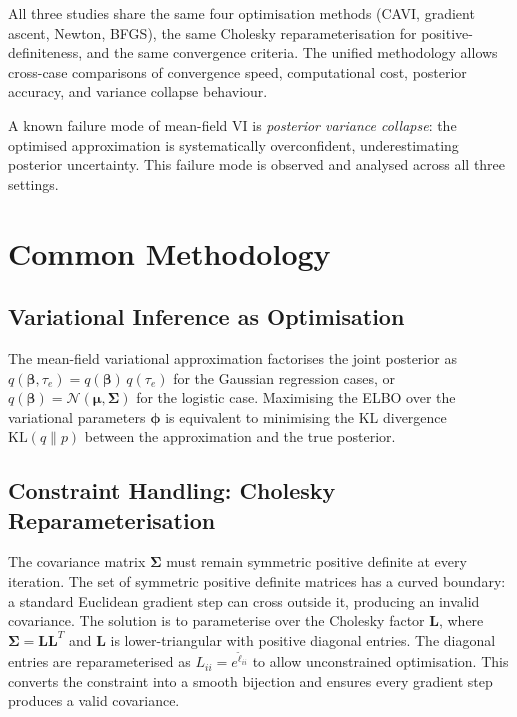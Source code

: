 \documentclass[11pt,a4paper]{article}
\newcommand{\N}{\mathcal{N}}
\begin{document}
All three studies share the same four optimisation methods (CAVI, gradient ascent,
Newton, BFGS), the same Cholesky reparameterisation for positive-definiteness, and
the same convergence criteria.
The unified methodology allows cross-case comparisons of convergence speed,
computational cost, posterior accuracy, and variance collapse behaviour.

A known failure mode of mean-field VI is \emph{posterior variance collapse}: the
optimised approximation is systematically overconfident, underestimating posterior
uncertainty.
This failure mode is observed and analysed across all three settings.

\section{Common Methodology}
\label{sec:methodology}

\subsection{Variational Inference as Optimisation}

The mean-field variational approximation factorises the joint posterior as
$q(\bm{\beta}, \tau_e) = q(\bm{\beta})\,q(\tau_e)$ for the Gaussian regression cases,
or $q(\bm{\beta}) = \N(\bm{\mu}, \bm{\Sigma})$ for the logistic case.
Maximising the ELBO over the variational parameters $\bm{\phi}$ is equivalent to
minimising the KL divergence $\mathrm{KL}(q\|p)$ between the approximation and the
true posterior.

\subsection{Constraint Handling: Cholesky Reparameterisation}

The covariance matrix $\bm{\Sigma}$ must remain symmetric positive definite at every
iteration.
The set of symmetric positive definite matrices has a curved boundary: a standard
Euclidean gradient step can cross outside it, producing an invalid covariance.
The solution is to parameterise over the Cholesky factor $\bm{L}$, where
$\bm{\Sigma} = \bm{L}\bm{L}^T$ and $\bm{L}$ is lower-triangular with positive diagonal
entries.
The diagonal entries are reparameterised as $L_{ii} = e^{\tilde{\ell}_{ii}}$ to allow
unconstrained optimisation.
This converts the constraint into a smooth bijection and ensures every gradient step
produces a valid covariance.
\end{document}

